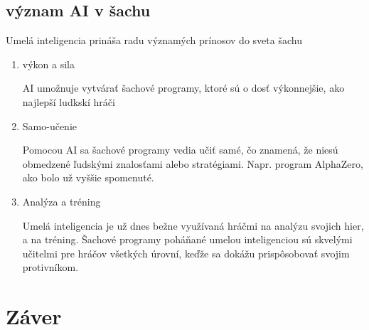 \documentclass[10pt,twoside,slovak,a4paper]{article}
\begin{document}
\subsection{význam AI v šachu} \label{RoleAI}
Umelá inteligencia prináša radu významých prínosov do sveta šachu
\begin{enumerate}
	\item výkon a sila

AI umožnuje vytvárať šachové programy, ktoré sú o dosť výkonnejšie, ako najlepší ludkskí hráči
	\item Samo-učenie

Pomocou AI sa šachové programy vedia učiť samé, čo znamená, že niesú obmedzené ľudskými znalosťami alebo stratégiami. Napr. program AlphaZero, ako bolo už vyššie spomenuté.

	\item Analýza a tréning

Umelá inteligencia je už dnes bežne využívaná hráčmi na analýzu svojich hier, a na tréning. Šachové programy poháňané umelou inteligenciou sú skvelými učitelmi pre hráčov všetkých úrovní, keďže sa dokážu prispôsobovať svojim protivníkom.

\end{enumerate}

\section{Záver} \label{zaver} %






\end{document}
